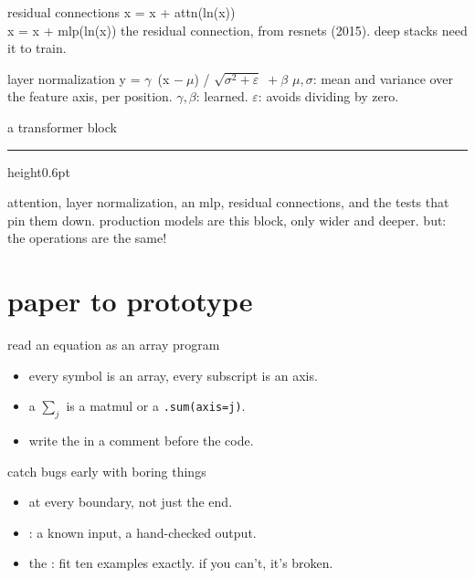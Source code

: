   \begin{frame}{residual connections}
      {x = x + attn(ln(x)) \\[0.4em] x = x + mlp(ln(x))}
      {the residual connection, from resnets (2015). deep stacks need it to train.}
  \end{frame}

  \begin{frame}{layer normalization}
      {y = $\gamma$ \,(x $-\ \mu$) / $\sqrt{\sigma^2 + \varepsilon}$\, $+\ \beta$}
      {$\mu, \sigma$: mean and variance over the feature axis, per position.
       $\gamma, \beta$: learned. $\varepsilon$: avoids dividing by zero.}
  \end{frame}


  \begin{frame}[t]{a transformer block}
    \paperheight
    \paperheight
    {\color{cwRule}\hrule height0.6pt}\vskip10pt
    {\cwhankenbody\color{cwFaint}\small attention, layer normalization, an mlp,
		residual connections, and the tests that pin them down. production models
		are this block, only wider and deeper. but: the operations are the same!}
  \end{frame}

  \section{paper to prototype}
  \begin{frame}{read an equation as an array program}
    \begin{itemize}
      \item every symbol is an array, every subscript is an axis.
      \item a $\sum_j$ is a matmul or a \texttt{.sum(axis=j)}.
      \item write the  in a comment before the code.
    \end{itemize}
  \end{frame}

  \begin{frame}{catch bugs early with boring things}
    \begin{itemize}
      \item {} at every boundary, not just the end.
      \item {}: a known input, a hand-checked output.
      \item the : fit ten examples exactly. if you can't, it's broken.
    \end{itemize}
  \end{frame}

